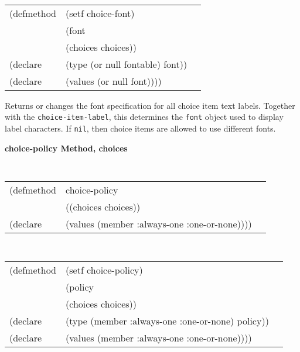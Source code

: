 {\samepage
\begin{flushright} \parbox[t]{6.125in}{
\tt
\begin{tabular}{lll}
\raggedright
(defmethod & (setf choice-font) & \\
         & (font \\
         & (choices choices)) \\
(declare &(type (or null fontable)  font))\\
(declare & (values (or null font))))
\end{tabular}
\rm
}
\end{flushright}}



\begin{flushright} \parbox[t]{6.125in}{
Returns or changes the font specification for all choice item text labels.
Together
with the {\tt choice-item-label}, this determines the {\tt font}
object used to display label characters. If {\tt nil}, then choice items are
allowed to use different fonts.

}\end{flushright}

{\samepage
{\large {\bf choice-policy \hfill Method, choices}}
\begin{flushright} \parbox[t]{6.125in}{
\tt
\begin{tabular}{lll}
\raggedright
(defmethod & choice-policy & \\
& ((choices  choices)) \\
(declare & (values (member :always-one :one-or-none))))
\end{tabular}
\rm

}\end{flushright}}

{\samepage
\begin{flushright} \parbox[t]{6.125in}{
\tt
\begin{tabular}{lll}
\raggedright
(defmethod & (setf choice-policy) & \\
         & (policy \\
         & (choices choices)) \\
(declare &(type (member :always-one :one-or-none)  policy))\\
(declare & (values (member :always-one :one-or-none))))
\end{tabular}
\rm
}
\end{flushright}}



